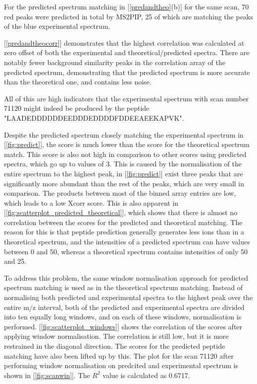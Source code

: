 \documentclass[11pt]{article}
\begin{document}
For the predicted spectrum matching in [\cref{predandtheo}(b)] for the same scan, 70 red peaks were predicted in total by MS2PIP, 25 of which are matching the peaks of the blue experimental spectrum.

[\cref{predandtheocorr}] demonstrates that the highest correlation was calculated at zero offset of both the experimental and theoretical/predicted spectra. There are notably fewer background similarity peaks in the correlation array of the predicted spectrum, demonstrating that the predicted spectrum is more accurate than the theoretical one, and contains less noise.

All of this are high indicators that the experimental spectrum with scan number 71120 might indeed be produced by the peptide "LAADEDDDDDDEEDDDEDDDDFDDEEAEEKAPVK".

Despite the predicted spectrum closely matching the experimental spectrum in [\cref{fig:predict}], the score is much lower than the score for the theoretical spectrum match. This score is also not high in comparison to other scores using predicted spectra, which go up to values of 3. This is caused by the normalisation of the entire spectrum to the highest peak, in [\cref{fig:predict}] exist three peaks that are significantly more abundant than the rest of the peaks, which are very small in comparison. The products between most of the binned array entries are low, which leads to a low Xcorr score. This is also apparent in [\cref{fig:scatterplot_predicted_theoretical}], which shows that there is almost no correlation between the scores for the predicted and theoretical matching. The reason for this is that peptide prediction generally generates less ions than in a theoretical spectrum, and the intensities of a predicted spectrum can have values between 0 and 50, whereas a theoretical spectrum contains intensities of only 50 and 25.

To address this problem, the same window normalisation approach for predicted spectrum matching is used as in the theoretical spectrum matching. Instead of normalising both predicted and experimental spectra to the highest peak over the entire m/z interval, both of the predicted and experimental spectra are divided into ten equally long windows, and on each of these windows, normalisation is performed. [\cref{fig:scatterplot_windows}] shows the correlation of the scores after applying window normalisation. The correlation is still low, but it is more restrained in the diagonal direction. The scores for the predicted peptide matching have also been lifted up by this. The plot for the scan 71120 after performing window normalisation on predcited and experimental spectrum is shown in [\cref{fig:scanwin}]. The \(R^2\) value is calculated as 0.6717.
\end{document}
